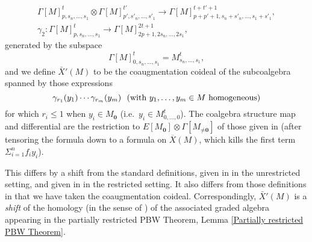 \documentclass[11pt]{amsart} \renewcommand{\baselinestretch}{1.2}
\theoremstyle{plain}
\numberwithin{equation}{section} %
\theoremstyle{plain}
\numberwithin{equation}{chapter} %
\renewcommand{\to}{\longrightarrow}
\newcommand{\citeBOX}[2][]{\cite[\mbox{#1}]{#2}}
\newcommand{\UEAX}{\bar{X}'}%
\begin{document}
\begin{appendices}
\begin{gather*}
\Gamma[M]_{p,s_n,\ldots,s_1}^{t}\otimes \Gamma[M]_{p',s'_n,\ldots,s'_1}^{t'}\to \Gamma[M]_{p+p'+1,s_n+s'_n,\ldots,s_1+s'_1}^{t+t'+1},
\\
\gamma_2:\Gamma[M]_{p,s_n,\ldots,s_1}^{t}\to \Gamma[M]_{2p+1,2s_n,\ldots,2s_1}^{2t+1},
\end{gather*}
generated by the subspace
\[\Gamma[M]_{0,s_n,\ldots,s_1}^{t}=M_{s_n,\ldots,s_1}^{t},\]
and we define $\UEAX(M)$ to be the coaugmentation coideal of the subcoalgebra spanned by those expressions
\[\gamma_{r_1}(y_1)\cdots \gamma_{r_m}(y_m) \textup{\ \ (with $y_1,\ldots,y_m\in M$ homogeneous)}\]
for which  $r_i\leq1$ when $y_i\in M_{\textbf{0}}$ (i.e.\ $y_i\in M_{0,\ldots,0}^t$). The coalgebra structure map and differential are the restriction to $E[M_{\textbf{0}}]\otimes \Gamma[M_{\neq\textbf{0}}]$ of those given in \citeBOX[p.~141]{MayRestLie.pdf} (after tensoring the formula  \citeBOX[(6.19)]{MayRestLie.pdf} down to a formula on $\overline{X}(M)$, which kills the first term $\Sigma_{i=1}^nf_iy_i$).


This differs by a shift from the standard definitions, given in \cite{MR0024908} in the unrestricted setting, and  given in \cite{MayRestLie.pdf} in the  restricted setting. It also differs from those definitions in that we have taken the coaugmentation coideal.  Correspondingly, $\UEAX(M)$  is a \emph{shift} of the homology (in the sense of \cite{PriddyKoszul.pdf}) of the associated graded algebra appearing in the partially restricted PBW Theorem, Lemma \ref{Partially restricted PBW Theorem}. 


\end{appendices}
\end{document}
